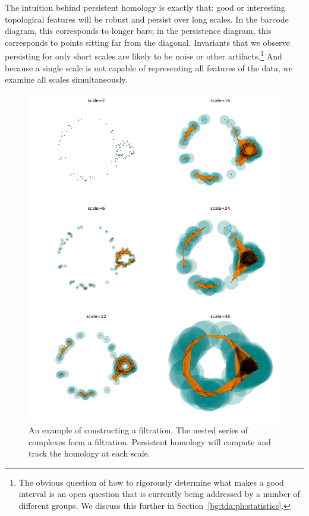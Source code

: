 The intuition behind persistent homology is exactly that: good or interesting topological features will be robust and persist over long scales.
In the barcode diagram, this corresponds to longer bars; in the persistence diagram, this corresponds to points sitting far from the diagonal.
Invariants that we observe persisting for only short scales are likely to be noise or other artifacts.\footnote{The obvious question of how to rigorously determine what makes a good interval is an open question that is currently being addressed by a number of different groups. We discuss this further in Section~\ref{bg:tda:ph:statistics}.}
And because a single scale is not capable of representing all features of the data, we examine all scales simultaneously.

\begin{figure}
\centering
\includegraphics[width=.8\textwidth]{./fig/background/expanding_balls.pdf}
\caption[Multiscale Topological Structure]{An example of constructing a filtration. The nested series of complexes form a filtration. Persistent homology will compute and track the homology at each scale.}
\label{fig:bg:expanding_balls}
\end{figure}

